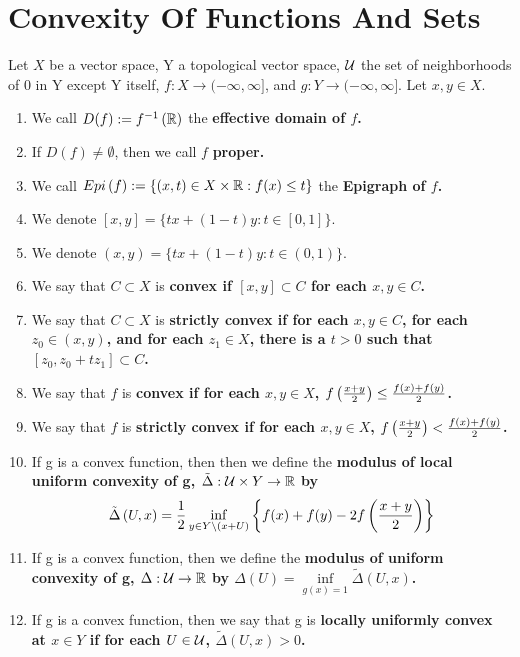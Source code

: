 
\section{Convexity Of Functions And Sets}
\begin{df}
    \label{df:convexfunction}
    Let $X$ be a vector space, Y a topological vector space, $\mathcal{U}$ the set of neighborhoods of 0 in Y except Y itself, $f:X \to (-\infty,\infty]$, and $g:Y \to (-\infty,\infty]$.
    Let $x,y \in X$. 
    \begin{enumerate}
        \item We call $D(f):= f^{-1}\left( \mathbb{R}\right)$ the \bf effective domain \rm of $f$. 
        \item If $D(f) \neq \emptyset$, then we call $f$ \bf proper.\rm
        \item We call $Epi\left( f\right) :=\{ (x,t) \in X \times \mathbb{R} : f(x) \leq t \}$ the \bf Epigraph \rm of $f$. 
        \item We denote $[x,y] = \{tx+(1-t)y: t \in [0,1]\}$.
        \item We denote $(x,y)=\{tx+(1-t)y: t \in (0,1)\}$.
        \item We say that $C\subset X$ is \bf convex \rm if $[x,y] \subset C$ for each $x,y \in C$. 
        \item We say that $C \subset X$ is \bf strictly convex \rm if for each $x,y \in C$, for each $z_0 \in (x,y)$, and for each $z_1 \in X$, there is a $t > 0$ such that $[z_0,z_0+tz_1] \subset C$. 
        \item We say that $f$ is \bf convex \rm if for each $x,y \in X$, $f\left( \frac{x+y}{2}\right) \leq \frac{f(x)+f(y)}{2}$. 
        \item We say that $f$ is \bf strictly convex \rm if for each $x,y \in X$, $f\left( \frac{x+y}{2}\right) < \frac{f(x)+f(y)}{2}$. 
        \item If g is a convex function, then then we define the \bf modulus of local uniform convexity \rm of g, $\tilde{\Delta}:\mathcal{U} \times Y\to \mathbb{R}$ by
        \begin{equation}
            \tilde{\Delta} \left( U, x\right) = \frac{1}{2} \inf\limits_{y \in Y \setminus (x+U)} \left\{ f(x)+f(y)-2f\left( \frac{x+y}{2}\right)\right\}
        \end{equation}
        \item If g is a convex function, then we define the \bf modulus of uniform convexity \rm of g, $\Delta:\mathcal{U} \to \mathbb{R}$ by  $\Delta(U) = \inf\limits_{g(x)=1} \tilde{\Delta}(U,x)$. 
        \item If g is a convex function, then we say that g is \bf locally uniformly convex  at \rm  $x \in Y$ if for each $U \in \mathcal{U}$, $\tilde{\Delta}(U,x) > 0$. 

\end{enumerate}
\end{df}
